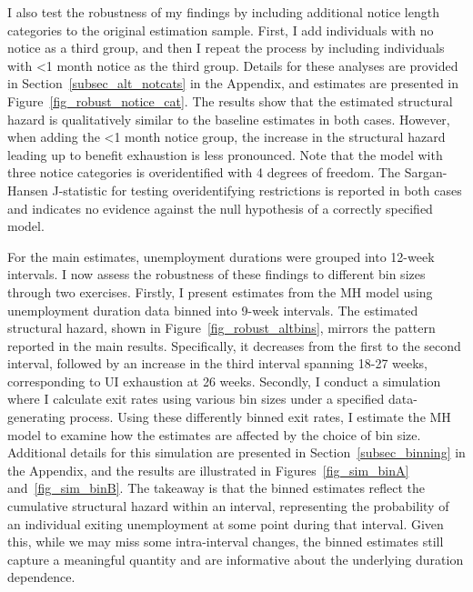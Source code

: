 \documentclass{div}
\begin{document}
I also test the robustness of my findings by including additional notice length categories to the original estimation sample. First, I add individuals with no notice as a third group, and then I repeat the process by including individuals with <1 month notice as the third group. Details for these analyses are provided in Section~\ref{subsec_alt_notcats} in the Appendix, and estimates are presented in Figure~\ref{fig_robust_notice_cat}. The results show that the estimated structural hazard is qualitatively similar to the baseline estimates in both cases. However, when adding the <1 month notice group, the increase in the structural hazard leading up to benefit exhaustion is less pronounced. Note that the model with three notice categories is overidentified with 4 degrees of freedom. The Sargan-Hansen J-statistic for testing overidentifying restrictions is reported in both cases and indicates no evidence against the null hypothesis of a correctly specified model.

For the main estimates, unemployment durations were grouped into 12-week intervals. I now assess the robustness of these findings to different bin sizes through two exercises. Firstly, I present estimates from the MH model using unemployment duration data binned into 9-week intervals. The estimated structural hazard, shown in Figure~\ref{fig_robust_altbins}, mirrors the pattern reported in the main results. Specifically, it decreases from the first to the second interval, followed by an increase in the third interval spanning 18-27 weeks, corresponding to UI exhaustion at 26 weeks. Secondly, I conduct a simulation where I calculate exit rates using various bin sizes under a specified data-generating process. Using these differently binned exit rates, I estimate the MH model to examine how the estimates are affected by the choice of bin size. Additional details for this simulation are presented in Section~\ref{subsec_binning} in the Appendix, and the results are illustrated in Figures~\ref{fig_sim_binA} and~\ref{fig_sim_binB}. The takeaway is that the binned estimates reflect the cumulative structural hazard within an interval, representing the probability of an individual exiting unemployment at some point during that interval. Given this, while we may miss some intra-interval changes, the binned estimates still capture a meaningful quantity and are informative about the underlying duration dependence.
\end{document}
